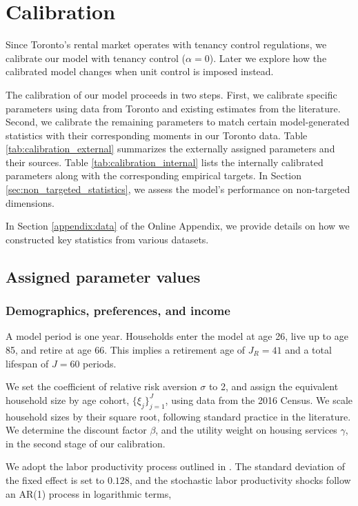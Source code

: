 \documentclass[parskip=full]{article}
\begin{document}
\section{Calibration}\label{sec:calibration}

Since Toronto's rental market operates with tenancy control regulations, we calibrate our model with tenancy control ($\alpha=0$). Later we explore how the calibrated model changes when unit control is imposed instead.

The calibration of our model proceeds in two steps. First, we calibrate specific parameters using data from Toronto and existing estimates from the literature. Second, we calibrate the remaining parameters to match certain model-generated statistics with their corresponding moments in our Toronto data. Table \ref{tab:calibration_external} summarizes the externally assigned parameters and their sources. Table \ref{tab:calibration_internal} lists the internally calibrated parameters along with the corresponding empirical targets. In Section \ref{sec:non_targeted_statistics}, we assess the model's performance on non-targeted dimensions.

In Section \ref{appendix:data} of the Online Appendix, we provide details on how we constructed key statistics from various datasets. 

\subsection{Assigned parameter values}

\subsubsection{Demographics, preferences, and income}
A model period is one year. Households enter the model at age 26, live up to age 85, and retire at age 66. This implies a retirement age of $J_{R}=41$ and a total lifespan of $J=60$ periods. 

We set the coefficient of relative risk aversion $\sigma$ to 2, and assign the equivalent household size by age cohort, $\{\xi_{j}\}_{j=1}^{J}$, using data from the 2016 Census. We scale household sizes by their square root, following standard practice in the literature. We determine the discount factor $\beta$, and the utility weight on housing services $\gamma$, in the second stage of our calibration.

We adopt the labor productivity process outlined in \citet{gkkoc}. The standard deviation of the fixed effect is set to $0.128$, and the stochastic labor productivity shocks follow an AR(1) process in logarithmic terms,
\end{document}
